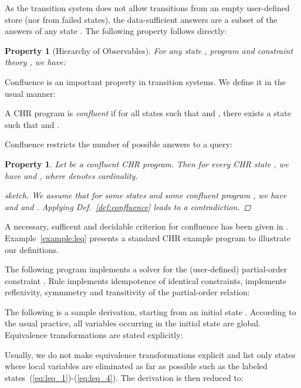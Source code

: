 \documentclass[acmtocl]{acmtrans2m}
\newtheorem{property}[theorem]{Property}
\begin{document}
As the transition system does not allow transitions from an empty user-defined
store (nor from failed states), the data-sufficient answers
 are a subset of the answers  of any state
. The following property follows directly:

\begin{property}[Hierarchy of Observables]
For any state , program  and constraint theory , we have:

\end{property}

Confluence is an important property in transition systems. We define it in the
usual manner:

\begin{definition}[Confluence]
\label{def:confluence}
A CHR program  is \emph{confluent} if for all states  such that
 and , there exists a state  such that
 and .
\end{definition}

Confluence restricts the number of possible answers to a query:

\begin{property}\label{prop:confluence-answers}
Let  be a confluent CHR program. Then for every CHR state , we have
 and , where
 denotes cardinality.
\begin{proof}[sketch]
We assume that for some states  and some confluent program , we
have  and  and . Applying
Def.~\ref{def:confluence} leads to a contradiction.
\end{proof}
\end{property}

A necessary, sufficent and decidable criterion for confluence has been given in
. Example~\ref{example:leq} presents a
standard CHR example program to illustrate our definitions.

\begin{example}
\label{example:leq}

The following program implements a solver for the (user-defined) partial-order
constraint . Rule  implements idempotence of identical constraints,
 implements reflexivity,  symmmetry and  transitivity of the
partial-order relation:

\medskip


\medskip
The following is a sample derivation, starting from an initial state
. According
to the usual practice, all variables occurring in the initial state are global.
Equivalence transformations are stated explicitly:

\setcounter{equation}{0}


Usually, we do not make equivalence transformations explicit and list only
states where local variables are eliminated as far as possible such as the
labeled states~(\ref{eq:leq_1})-(\ref{eq:leq_4}). The derivation is then reduced
to:
\setcounter{equation}{0}

\end{example}
\end{document}
